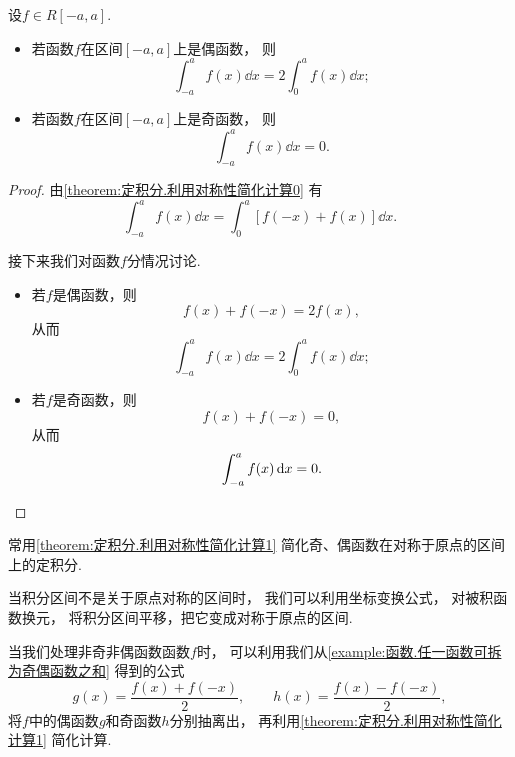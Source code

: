 \begin{proposition}\label{theorem:定积分.利用对称性简化计算1}
设\(f \in R[-a,a]\).
\begin{itemize}
	\item 若函数\(f\)在区间\([-a,a]\)上是偶函数，
	则\[
		\int_{-a}^a f(x) \dd{x}
		= 2 \int_0^a f(x) \dd{x};
	\]

	\item 若函数\(f\)在区间\([-a,a]\)上是奇函数，
	则\[
		\int_{-a}^a f(x) \dd{x} = 0.
	\]
\end{itemize}
\begin{proof}
由\cref{theorem:定积分.利用对称性简化计算0} 有\[
	\int_{-a}^a f(x) \dd{x}
	= \int_0^a [f(-x) + f(x)] \dd{x}.
\]

接下来我们对函数\(f\)分情况讨论.
\begin{itemize}
	\item 若\(f\)是偶函数，则\[
		f(x) + f(-x) = 2 f(x),
	\]
	从而\[
		\int_{-a}^a f(x) \dd{x} = 2 \int_0^a f(x) \dd{x};
	\]

	\item 若\(f\)是奇函数，则\[
		f(x) + f(-x) = 0,
	\]
	从而\[
		\int_{-a}^a f(x) \dd{x} = 0.
		\qedhere
	\]
\end{itemize}
\end{proof}
\end{proposition}

\begin{remark}
常用\cref{theorem:定积分.利用对称性简化计算1} 简化奇、偶函数在对称于原点的区间上的定积分.

当积分区间不是关于原点对称的区间时，
我们可以利用坐标变换公式，
对被积函数换元，
将积分区间平移，把它变成对称于原点的区间.

当我们处理非奇非偶函数函数\(f\)时，
可以利用我们从\cref{example:函数.任一函数可拆为奇偶函数之和} 得到的公式\[
	g(x) = \frac{f(x) + f(-x)}{2}, \qquad
	h(x) = \frac{f(x) - f(-x)}{2},
\]
将\(f\)中的偶函数\(g\)和奇函数\(h\)分别抽离出，
再利用\cref{theorem:定积分.利用对称性简化计算1} 简化计算.
\end{remark}

